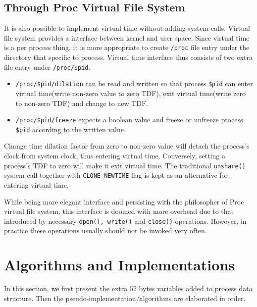 \documentclass{acm_proc_article-sp}
\begin{document}
\subsection{Through Proc Virtual File System}
It is also possible to implement virtual time without adding system calls. Virtual file system provides a interface between kernel and user space. Since virtual time is a per process thing, it is more appropriate to create \texttt{/proc} file entry under the directory that specific to process. Virtual time interface thus consists of two extra file entry under \texttt{/proc/\$pid}.
\begin{itemize}
\item \texttt{/proc/\$pid/dilation} can be read and written so that process \texttt{\$pid} can enter virtual time(write non-zero value to zero TDF), exit virtual time(write zero to non-zero TDF) and change to new TDF.
\item \texttt{/proc/\$pid/freeze} expects a boolean value and freeze or unfreeze process \texttt{\$pid} according to the written value. 
\end{itemize}
Change time dilation factor from zero to non-zero value will detach the process's clock from system clock, thus entering virtual time. Conversely, setting a process's TDF to zero will make it exit virtual time. 
The traditional \texttt{unshare()} system call together with \texttt{CLONE\_NEWTIME} flag is kept as an alternative for entering virtual time.

While being more elegant interface and persisting with the philosopher of Proc virtual file system, this interface is doomed with more overhead due to that introduced by necessary \texttt{open(), write()} and \texttt{close()} operations. 
However, in practice these operations usually should not be invoked very often.

\section{Algorithms and Implementations}
In this section, we first present the extra 52 bytes variables added to process data structure. Then the pseudo-implementation/algorithms are elaborated in order.
\end{document}
